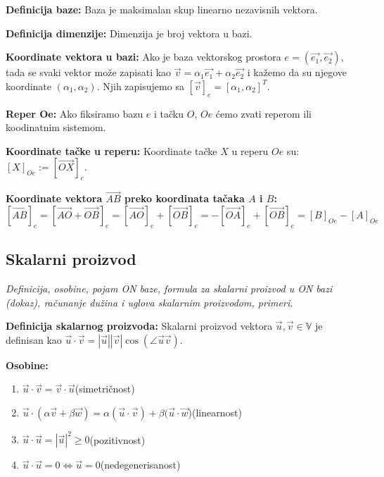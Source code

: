 \documentclass[12pt]{article}
\newcommand{\vek}[1]{\overrightarrow{#1}}
\begin{document}
\textbf{Definicija baze:} Baza je maksimalan skup linearno nezavisnih vektora.
\par

\textbf{Definicija dimenzije:} Dimenzija je broj vektora u bazi.
\par

\textbf{Koordinate vektora u bazi:} Ako je baza vektorskog prostora
$e=(\vek{e_1}, \vek{e_2})$, tada se svaki vektor može zapisati kao
$\vek{v}=\alpha_1\vek{e_1}+\alpha_2\vek{e_2}$ i kažemo da su njegove
koordinate $(\alpha_1, \alpha_2)$. Njih zapisujemo sa
$[\vek{v}]_e=[\alpha_1, \alpha_2]^T$.
\par

\textbf{Reper Oe:} Ako fiksiramo bazu $e$ i tačku $O$, $Oe$ ćemo zvati reperom
ili koodinatnim sistemom.
\par

\textbf{Koordinate tačke u reperu:} Koordinate tačke $X$ u reperu $Oe$ su:
$[X]_{Oe}:=[\vek{OX}]_e$.
\par

\textbf{Koordinate vektora $\vek{AB}$ preko koordinata tačaka $A$ i $B$:}
$$[\vek{AB}]_e=[\vek{AO}+\vek{OB}]_e=[\vek{AO}]_e+[\vek{OB}]_e=
    -[\vek{OA}]_e+[\vek{OB}]_e=[B]_{Oe}-[A]_{Oe}$$


\subsection{Skalarni proizvod}
\textit{Definicija, osobine, pojam ON baze, formula za skalarni proizvod u ON
    bazi (dokaz), računanje dužina i uglova skalarnim proizvodom, primeri.}
\par
\vspace*{1cm}

\textbf{Definicija skalarnog proizvoda:} Skalarni proizvod vektora
$\vek{u},\vek{v}\in\mathbb{V}$ je definisan kao $\vek{u}\cdot\vek{v}=|\vek{u}|
    |\vek{v}|\cos(\angle{\vek{u}\vek{v}})$.
\par

\textbf{Osobine:}
\begin{enumerate}[label=\textit{\arabic*)}]
    \item $\vek{u}\cdot\vek{v}=\vek{v}\cdot\vek{u}$\hspace*{1cm}(simetričnost)
    \item $\vek{u}\cdot(\alpha\vek{v}+\beta\vek{w})=\alpha(\vek{u}\cdot\vek{v})
          +\beta(\vek{u}\cdot\vek{w}$)\hspace*{1cm}(linearnost)
    \item $\vek{u}\cdot\vek{u}=|\vek{u}|^2\geq0$\hspace*{1cm}(pozitivnost)
    \item $\vek{u}\cdot\vek{u}=0\iff\vek{u}=0$\hspace*{1cm}(nedegenerisanost)
\end{enumerate}
\par
\end{document}
